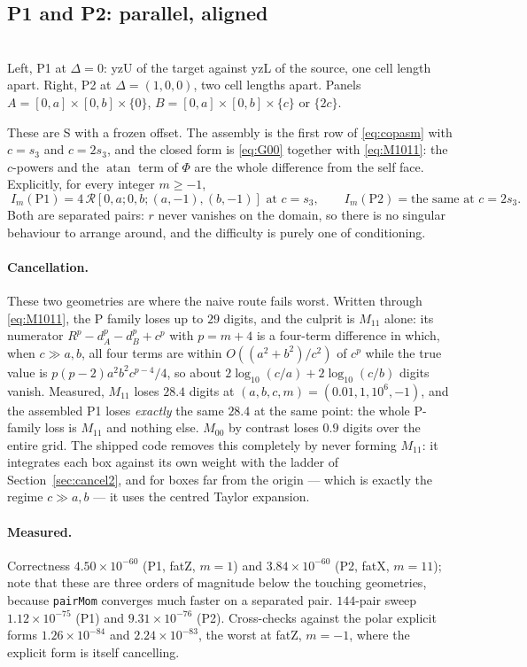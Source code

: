 \documentclass[11pt]{article}
\theoremstyle{remark}
\newcommand{\atan}{\operatorname{atan}}
\newcommand{\code}[1]{\texttt{#1}}
\newcommand{\geofig}[2]{\begin{center}#1\\[2pt]{\footnotesize #2}\end{center}}
\begin{document}
\subsection{P1 and P2: parallel, aligned}
\label{sec:P12}

\geofig{\figPa\qquad\figPb}{Left, P1 at $\Delta = 0$: yzU of the target against yzL of the
source, one cell length apart. Right, P2 at $\Delta = (1,0,0)$, two cell lengths apart.
Panels $A = [0,a]\times[0,b]\times\{0\}$, $B = [0,a]\times[0,b]\times\{c\}$ or
$\{2c\}$.}

These are S with a frozen offset. The assembly is the first row of \eqref{eq:copasm} with
$c = s_3$ and $c = 2s_3$, and the closed form is \eqref{eq:G00} together with
\eqref{eq:M1011}: the $c$-powers and the $\atan$ term of $\Phi$ are the whole difference
from the self face. Explicitly, for every integer $m\ge -1$,
\begin{equation}
\boxed{\;
I_m(\text{P1}) = 4\,\mathcal{R}[0,a;0,b;(a,-1),(b,-1)] \text{ at } c = s_3,
\qquad
I_m(\text{P2}) = \text{the same at } c = 2s_3 . \;}
\end{equation}
Both are separated pairs: $r$ never vanishes on the domain, so there is no singular
behaviour to arrange around, and the difficulty is purely one of conditioning.

\paragraph{Cancellation.} These two geometries are where the naive route fails worst.
Written through \eqref{eq:M1011}, the P family loses up to $29$ digits, and the culprit is
$M_{11}$ alone: its numerator $R^{p} - d_A^{p} - d_B^{p} + c^{p}$ with $p = m+4$ is a
four-term difference in which, when $c \gg a, b$, all four terms are within
$O((a^2+b^2)/c^2)$ of $c^{p}$ while the true value is $p(p-2)a^2b^2c^{p-4}/4$, so about
$2\log_{10}(c/a) + 2\log_{10}(c/b)$ digits vanish. Measured, $M_{11}$ loses $28.4$ digits
at $(a,b,c,m) = (0.01, 1, 10^{6}, -1)$, and the assembled P1 loses \emph{exactly} the same
$28.4$ at the same point: the whole P-family loss is $M_{11}$ and nothing else. $M_{00}$
by contrast loses $0.9$ digits over the entire grid. The shipped code removes this
completely by never forming $M_{11}$: it integrates each box against its own weight with
the ladder of Section~\ref{sec:cancel2}, and for boxes far from the origin --- which is
exactly the regime $c \gg a,b$ --- it uses the centred Taylor expansion.

\paragraph{Measured.} Correctness $4.50\times10^{-60}$ (P1, fatZ, $m=1$) and
$3.84\times10^{-60}$ (P2, fatX, $m=11$); note that these are three orders of magnitude
below the touching geometries, because \code{pairMom} converges much faster on a separated
pair. $144$-pair sweep $1.12\times10^{-75}$ (P1) and $9.31\times10^{-76}$ (P2).
Cross-checks against the polar explicit forms $1.26\times10^{-84}$ and
$2.24\times10^{-83}$, the worst at fatZ, $m=-1$, where the explicit form is itself
cancelling.
\end{document}
